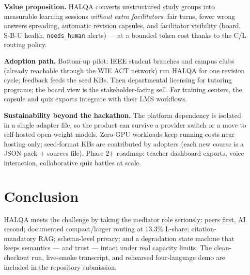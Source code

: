 \documentclass[10pt,twocolumn]{IEEEtran}
\begin{document}
\textbf{Value proposition.} HALQA converts unstructured study groups into measurable learning sessions \emph{without extra facilitators}: fair turns, fewer wrong answers spreading, automatic revision capsules, and facilitator visibility (board, S-B-U health, \texttt{needs\_human} alerts) --- at a bounded token cost thanks to the C/L routing policy.

\textbf{Adoption path.} Bottom-up pilot: IEEE student branches and campus clubs (already reachable through the WIE ACT network) run HALQA for one revision cycle; feedback feeds the seed KBs. Then departmental licensing for tutoring programs; the board view is the stakeholder-facing sell. For training centers, the capsule and quiz exports integrate with their LMS workflows.

\textbf{Sustainability beyond the hackathon.} The platform dependency is isolated in a single adapter file, so the product can survive a provider switch or a move to self-hosted open-weight models. Zero-GPU workloads keep running costs near hosting only; seed-format KBs are contributed by adopters (each new course is a JSON pack + sources file). Phase 2+ roadmap: teacher dashboard exports, voice interaction, collaborative quiz battles at scale.

\section{Conclusion}
HALQA meets the challenge by taking the mediator role seriously: peers first, AI second; documented compact/larger routing at 13.3\% L-share; citation-mandatory RAG; schema-level privacy; and a degradation state machine that keeps semantics --- and trust --- intact under real capacity limits. The clean-checkout run, live-smoke transcript, and rehearsed four-language demo are included in the repository submission.
\end{document}
